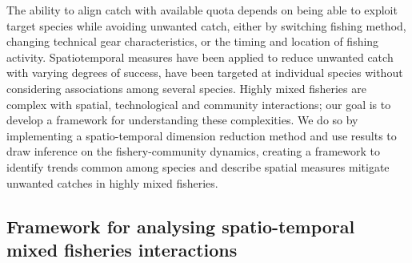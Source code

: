 \documentclass{nature}
\begin{document}
\begin{linenumbers}
The ability to align catch with available
quota depends on being able to exploit target species while avoiding unwanted
catch, either by switching fishing method, changing technical gear characteristics, or the timing and location of
fishing activity\cite{vanPutten2012a}. Spatiotemporal
measures have been applied to
reduce unwanted catch with varying degrees of success\cite{Needle2011,
	Dunn2014a}, 
 have been targeted at individual species
without considering associations among several
species. Highly mixed fisheries are complex with spatial, technological and
community interactions;  our goal is to develop a framework for
understanding these complexities. We do so by implementing a spatio-temporal
dimension reduction method and use  results to draw inference on
the fishery-community dynamics, creating a framework to identify trends common
among species  and describe  spatial measures
 mitigate unwanted
catches in highly mixed fisheries.


\subsection{Framework for analysing spatio-temporal mixed fisheries
	interactions}


\end{linenumbers}
\end{document}
